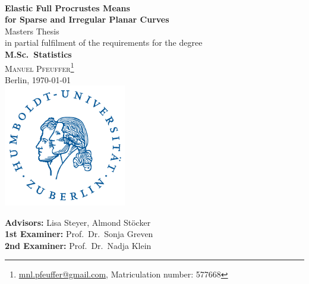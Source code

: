 \documentclass[a4paper,12pt,english,headings=small,oneside]{scrreprt}
\theoremstyle{plain}
\theoremstyle{definition}
\theoremstyle{remark}
\theoremstyle{plain}
\begin{document}

\begin{titlepage}
  \begin{center}
  \\
  \vspace{1.66cm}
    {\LARGE\sffamily\textbf{Elastic Full Procrustes Means\vspace{0.5cm}\\
    for Sparse and Irregular Planar Curves}}
  \vspace{1.2cm}\\
    {\large Masters Thesis}\\
    in partial fulfilment of the requirements for the degree\\
    \textbf{M.Sc.\ Statistics}
  \vspace{1.2cm}\\
  \textsc{\large Manuel Pfeuffer\footnote{\url{mnl.pfeuffer@gmail.com}, Matriculation number: 577668}}\\
    Berlin, {\AdvanceDate[1]\today}
  \vspace{2.0cm}\\
    \includegraphics[width=0.4\textwidth]{graphics/hulogo.pdf}
  \vspace{0.5cm}\\

  \vfill
  \end{center}

  \noindent \textbf{Advisors:} Lisa Steyer, Almond Stöcker\\
  \noindent \textbf{1st Examiner:} Prof.\ Dr.\ Sonja Greven\\
  \noindent \textbf{2nd Examiner:} Prof.\ Dr.\ Nadja Klein
  \vspace{0.5em}

\end{titlepage}

\tableofcontents
\end{document}
